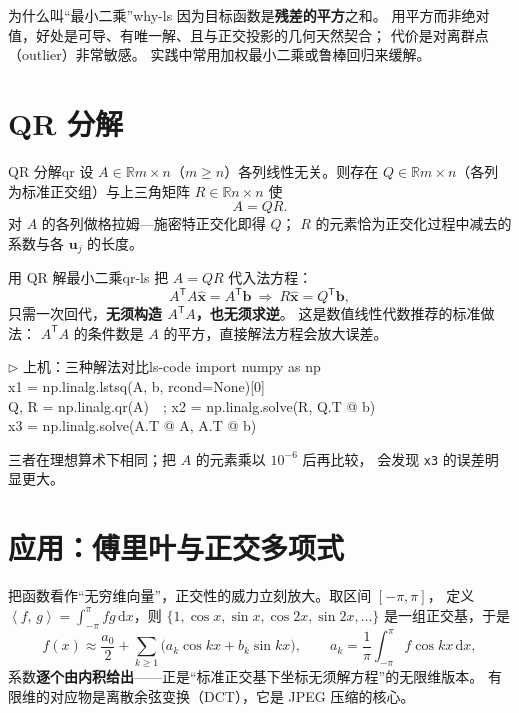 \documentclass[11pt,a4paper,openany]{ctexbook}
\newcommand{\R}{\mathbb{R}}
\newcommand{\ip}[2]{\left\langle #1,\,#2 \right\rangle}
\begin{document}
\begin{remk}{为什么叫“最小二乘”}{why-ls}
因为目标函数是\textbf{残差的平方}之和。
用平方而非绝对值，好处是可导、有唯一解、且与正交投影的几何天然契合；
代价是对离群点（outlier）非常敏感。
实践中常用加权最小二乘或鲁棒回归来缓解。
\end{remk}

\section{QR 分解}

\begin{thm}{QR 分解}{qr}
设 $A\in\R{m\times n}$（$m\ge n$）各列线性无关。则存在
$Q\in\R{m\times n}$（各列为标准正交组）与上三角矩阵 $R\in\R{n\times n}$ 使
\[
A=QR.
\]
对 $A$ 的各列做格拉姆—施密特正交化即得 $Q$；
$R$ 的元素恰为正交化过程中减去的系数与各 $\boldsymbol{u}_j$ 的长度。
\end{thm}

\begin{prop}{用 QR 解最小二乘}{qr-ls}
把 $A=QR$ 代入法方程：
\[
A^{\mathsf T}A\widehat{\boldsymbol{x}}=A^{\mathsf T}\boldsymbol{b}
\ \Longrightarrow\
R\widehat{\boldsymbol{x}}=Q^{\mathsf T}\boldsymbol{b},
\]
只需一次回代，\textbf{无须构造 $A^{\mathsf T}A$，也无须求逆}。
这是数值线性代数推荐的标准做法：
$A^{\mathsf T}A$ 的条件数是 $A$ 的平方，直接解法方程会放大误差。
\end{prop}

\begin{remk}{$\triangleright$ 上机：三种解法对比}{ls-code}
{\small\ttfamily
import numpy as np\\
x1 = np.linalg.lstsq(A, b, rcond=None)[0]\\
Q, R = np.linalg.qr(A)\ \ ; x2 = np.linalg.solve(R, Q.T @ b)\\
x3 = np.linalg.solve(A.T @ A, A.T @ b)}
\par\smallskip
\noindent 三者在理想算术下相同；把 $A$ 的元素乘以 $10^{-6}$ 后再比较，
会发现 \texttt{x3} 的误差明显更大。
\end{remk}

\section{应用：傅里叶与正交多项式}

把函数看作“无穷维向量”，正交性的威力立刻放大。取区间 $[-\pi,\pi]$，
定义 $\ip{f}{g}=\int_{-\pi}^{\pi}f g\,\mathrm{d}x$，则
$\{1,\cos x,\sin x,\cos 2x,\sin 2x,\dots\}$ 是一组正交基，于是
\[
f(x)\approx\frac{a_0}{2}+\sum_{k\ge1}\bigl(a_k\cos kx+b_k\sin kx\bigr),
\qquad
a_k=\frac{1}{\pi}\int_{-\pi}^{\pi}f\cos kx\,\mathrm{d}x,
\]
系数\textbf{逐个由内积给出}——正是“标准正交基下坐标无须解方程”的无限维版本。
有限维的对应物是离散余弦变换（DCT），它是 JPEG 压缩的核心。
\end{document}
